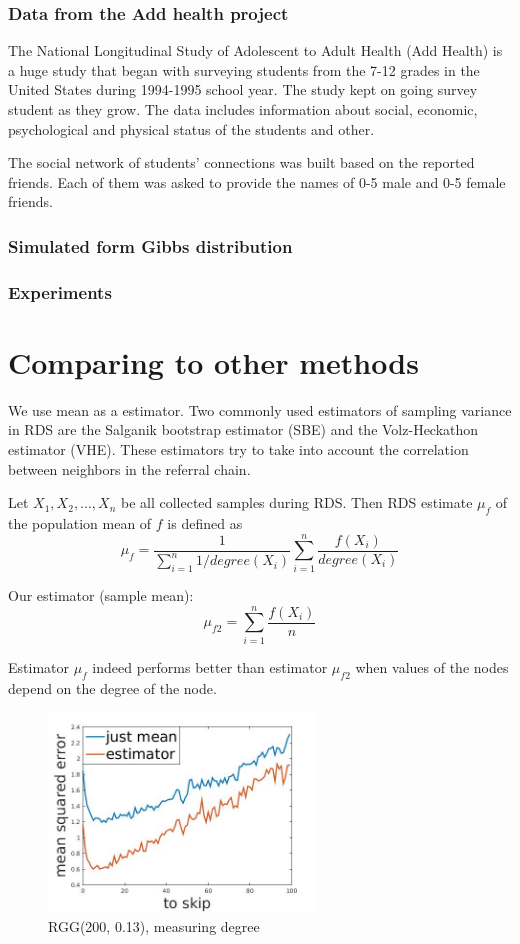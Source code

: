 \documentclass[12pt]{report}
\begin{document}
\subsection{Data from the Add health project}

The National Longitudinal Study of Adolescent to Adult Health (Add Health) is a huge study that began with surveying students from the 7-12 grades in the United States during 1994-1995 school year. The study kept on going survey student as they grow. The 
data includes information about social, economic, psychological and physical status of the students and other. 

The social network of students' connections was built based on the reported friends. Each of them was asked to provide the names of 0-5 male and 0-5 female friends.

\subsection{Simulated form Gibbs distribution}

\subsection{Experiments}

\chapter{Comparing to other methods}

We use mean as a estimator.
Two commonly used estimators of sampling variance in RDS are the Salganik bootstrap estimator (SBE) and the Volz-Heckathon estimator (VHE). These estimators try to take into account the correlation between neighbors in the referral chain.


Let $X_1, X_2, ..., X_n$ be all collected samples during RDS.
Then RDS estimate $\mu_f$ of the population mean of $f$ is defined \cite{goel2010assessing} as
$$\mu_f = \frac{1}{\sum\limits_{i=1}^n 1/degree(X_i)} \sum\limits_{i=1}^n \frac{f(X_i)}{degree(X_i)}$$


Our estimator (sample mean):
$$\mu_{f2} = \sum\limits_{i=1}^n \frac{f(X_i)}{n}$$

Estimator $\mu_f$ indeed performs better than estimator $\mu_{f2}$ when values of the nodes depend on the degree of the node.


\begin{figure}[h]
    \centering
    \includegraphics[height=200px]{RGGdegree}
    \caption{ RGG(200, 0.13), measuring degree}
\end{figure}
\end{document}

